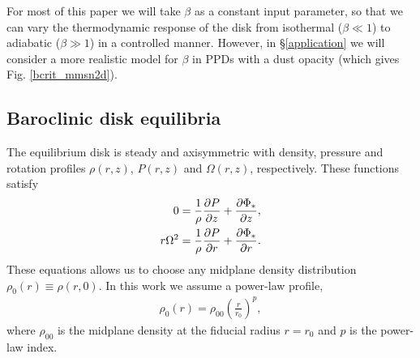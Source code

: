 For most of this paper we will take $\beta$ as a constant input
parameter, so that we can vary the thermodynamic response of the
disk from isothermal ($\beta\ll 1$) to adiabatic ($\beta \gg 1$) in a
controlled manner. However, in \S\ref{application} 
we will consider a more realistic model for $\beta$ in
PPDs with a dust opacity (which gives Fig.  \ref{bcrit_mmsn2d}).  
 
 




\subsection{Baroclinic disk equilibria}\label{eqm}
The equilibrium disk is steady and axisymmetric with density,
pressure and rotation profiles $\rho(r,z)$, $P(r,z)$ and
$\Omega(r,z)$, respectively. These functions satisfy  
\begin{align}
  0 &= \frac{1}{\rho}\frac{\partial P}{\partial z} + \frac{\partial \Phi_*}{\partial z},\label{vert_equilibrium}\\
  r\Omega^2&= \frac{1}{\rho}\frac{\partial P}{\partial r} + \frac{\partial \Phi_*}{\partial
    r}.\label{hori_equilibrium} 
\end{align} 
These equations allows us to choose any midplane density 
distribution $\rho_0(r)\equiv \rho(r,0)$. In this work we assume a
power-law profile, 
\begin{align}
  \rho_0(r) = \rho_{00}\left(\frac{r}{r_0}\right)^p,
\end{align}
where $\rho_{00}$ is the midplane density at the fiducial radius
$r=r_0$ and $p$ is the power-law index.  

